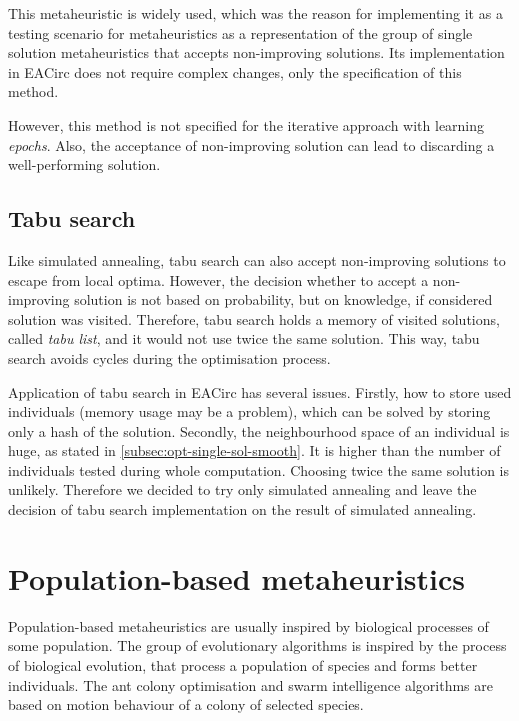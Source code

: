 \documentclass[
  print, %
  Table,   %
  nolof,     %
  nolot,     %
  11pt, %
  oneside  %
]{fithesis3}
\begin{document}
This metaheuristic is widely used, which was the reason for implementing it as a testing scenario for metaheuristics as a representation of the group of single solution metaheuristics that accepts non-improving solutions. Its implementation in EACirc does not require complex changes, only the specification of this method.

However, this method is not specified for the iterative approach with learning \textit{epochs}. Also, the acceptance of non-improving solution can lead to discarding a well-performing solution.

\subsection{Tabu search}
\label{subsec:opt-single-sol-tabu}

Like simulated annealing, tabu search can also accept non-improving solutions to escape from local optima. However, the decision whether to accept a non-improving solution is not based on probability, but on knowledge, if considered solution was visited. Therefore, tabu search holds a memory of visited solutions, called \textit{tabu list}, and it would not use twice the same solution. This way, tabu search avoids cycles during the optimisation process.

Application of tabu search in EACirc has several issues. Firstly, how to store used individuals (memory usage may be a problem), which can be solved by storing only a hash of the solution. Secondly, the neighbourhood space of an individual is huge, as stated in \cref{subsec:opt-single-sol-smooth}. It is higher than the number of individuals tested during whole computation. Choosing twice the same solution is unlikely. Therefore we decided to try only simulated annealing and leave the decision of tabu search implementation on the result of simulated annealing.

\section{Population-based metaheuristics}
\label{sec:opt-population}

Population-based metaheuristics are usually inspired by biological processes of some population. The group of evolutionary algorithms is inspired by the process of biological evolution, that process a population of species and forms better individuals. The ant colony optimisation and swarm intelligence algorithms are based on motion behaviour of a colony of selected species.
\end{document}
